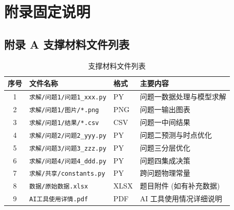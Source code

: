 
\section*{附录固定说明}

\subsection*{附录 A \quad 支撑材料文件列表}

\begin{table}[H]
  \centering
  \caption{支撑材料文件列表}
  \label{tab:appendix_files}
  \begin{tabular}{clll}
    \toprule
    \textbf{序号} & \textbf{文件名称} & \textbf{格式} & \textbf{主要内容} \\
    \midrule
    1 & \texttt{求解/问题1/问题1\_xxx.py} & PY & 问题一数据处理与模型求解 \\
    2 & \texttt{求解/问题1/图片/*.png} & PNG & 问题一输出图表 \\
    3 & \texttt{求解/问题1/结果/*.csv} & CSV & 问题一中间结果 \\
    4 & \texttt{求解/问题2/问题2\_yyy.py} & PY & 问题二预测与时点优化 \\
    5 & \texttt{求解/问题3/问题3\_zzz.py} & PY & 问题三分层优化 \\
    6 & \texttt{求解/问题4/问题4\_ddd.py} & PY & 问题四集成决策 \\
    7 & \texttt{求解/共享/constants.py} & PY & 跨问题物理常量 \\
    8 & \texttt{数据/原始数据.xlsx} & XLSX & 题目附件 (如有补充数据) \\
    9 & \texttt{AI工具使用详情.pdf} & PDF & AI 工具使用情况详细说明 \\
    \bottomrule
  \end{tabular}
\end{table}

